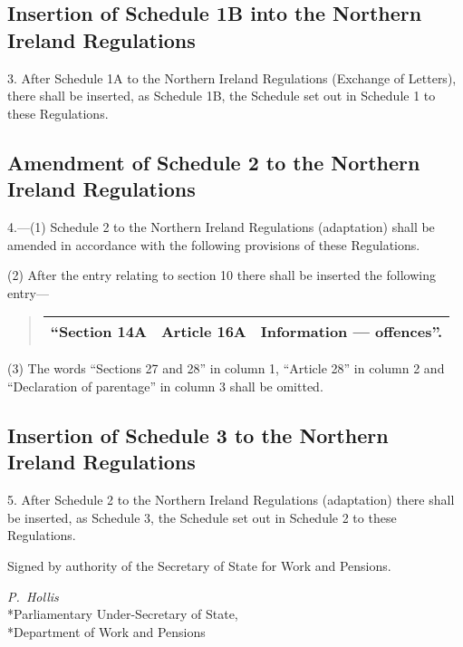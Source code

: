 \documentclass[12pt,a4paper]{article}
\begin{document}
\subsection[3. Insertion of Schedule 1B into the Northern Ireland Regulations]{Insertion of Schedule 1B into the Northern Ireland Regulations}

3.  After Schedule 1A to the Northern Ireland Regulations (Exchange of Letters), there shall be inserted, as Schedule 1B, the Schedule set out in Schedule 1 to these Regulations.

\subsection[4. Amendment of Schedule 2 to the Northern Ireland Regulations]{Amendment of Schedule 2 to the Northern Ireland Regulations}

4.---(1)  Schedule 2 to the Northern Ireland Regulations (adaptation) shall be amended in accordance with the following provisions of these Regulations.

(2) After the entry relating to section 10 there shall be inserted the following entry—
\begin{quotation}
\begin{tabulary}{\linewidth}{JJJ}
\hline
    “Section 14A &Article 16A &Information — offences”. \\
\hline
\end{tabulary}
\end{quotation}

(3) The words “Sections 27 and 28” in column 1, “Article 28” in column 2 and “Declaration of parentage” in column 3 shall be omitted.

\subsection[5. Insertion of Schedule 3 to the Northern Ireland Regulations]{Insertion of Schedule 3 to the Northern Ireland Regulations}

5.  After Schedule 2 to the Northern Ireland Regulations (adaptation) there shall be inserted, as Schedule 3, the Schedule set out in Schedule 2 to these Regulations. 

\bigskip

Signed 
by authority of the Secretary of State for Work and Pensions.

{\raggedleft
\emph{P.~Hollis}\\*Parliamentary Under-Secretary of State,\\*Department of Work and Pensions

}
\end{document}
